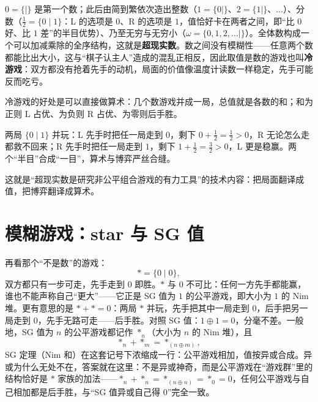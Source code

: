 $0=\{\mid\}$ 是第一个数；此后由简到繁依次造出整数（$1=\{0\mid\}$、$2=\{1\mid\}$、$\ldots$）、分数（$\tfrac12=\{0\mid 1\}$：L 的选项是 $0$、R 的选项是 $1$，值恰好卡在两者之间，即“比 $0$ 好、比 $1$ 差”的半目优势）、乃至无穷与无穷小（$\omega=\{0,1,2,\ldots\mid\}$）。全体数构成一个可以加减乘除的全序结构，这就是\textbf{超现实数}。数之间没有模糊性——任意两个数都能比出大小，这与“棋子认主人”造成的混乱正相反，因此取值是数的游戏也叫\textbf{冷游戏}：双方都没有抢着先手的动机，局面的价值像温度计读数一样稳定，先手可能反而吃亏。

冷游戏的好处是可以直接做算术：几个数游戏并成一局，总值就是各数的和；和为正则 L 占优、为负则 R 占优、为零则后手胜。

\begin{example}[$\tfrac12+\tfrac12=1$]
两局 $\{0\mid 1\}$ 并玩：L 先手时把任一局走到 $0$，剩下 $0+\tfrac12=\tfrac12>0$，R 无论怎么走都救不回来；R 先手时把任一局走到 $1$，剩下 $1+\tfrac12=\tfrac32>0$，L 更是稳赢。两个“半目”合成“一目”，算术与博弈严丝合缝。
\end{example}

这就是“超现实数是研究非公平组合游戏的有力工具”的技术内容：把局面翻译成值，把博弈翻译成算术。

\section{模糊游戏：star 与 SG 值}
再看那个“不是数”的游戏：
\[
 \ast=\{0\mid 0\},
\]
双方都只有一步可走，先手走到 $0$ 即胜。$\ast$ 与 $0$ 不可比：任何一方先手都能赢，谁也不能声称自己“更大”——它正是 SG 值为 $1$ 的公平游戏，即大小为 $1$ 的 Nim 堆。更有意思的是 $\ast+\ast=0$：两局 $\ast$ 并玩，先手把其中一局走到 $0$，后手把另一局走到 $0$，先手无路可走——后手胜。对照 SG 值：$1\oplus1=0$，分毫不差。一般地，SG 值为 $n$ 的公平游戏都记作 $\ast_n$（大小为 $n$ 的 Nim 堆），且
\[
 \ast_n+\ast_m=\ast_{(n\oplus m)},
\]
SG 定理（Nim 和）在这套记号下浓缩成一行：公平游戏相加，值按异或合成。异或为什么无处不在，答案就在这里：不是异或神奇，而是公平游戏在“游戏群”里的结构恰好是 $\ast$ 家族的加法——$\ast_n+\ast_n=\ast_{(n\oplus n)}=\ast_0=0$，任何公平游戏与自己相加都是后手胜，与“SG 值异或自己得 $0$”完全一致。


